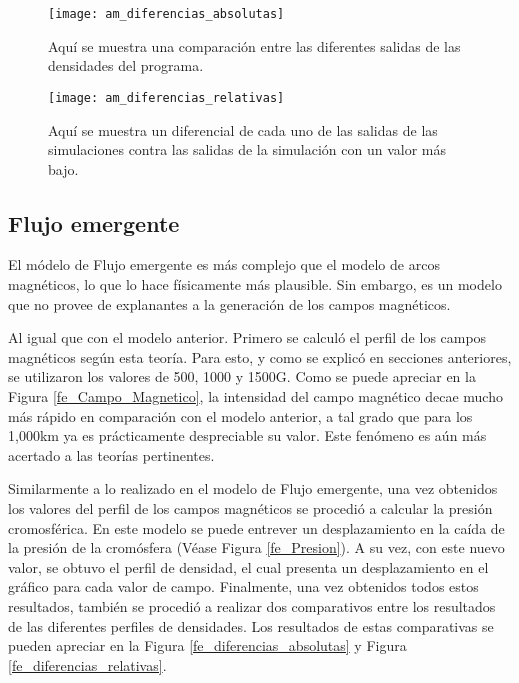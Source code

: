 \begin{figure}[h]
\centering
\texttt{[image: am\_diferencias\_absolutas]}
\caption{ Aqu\'i se muestra una comparaci\'on entre las diferentes salidas de las densidades del programa.}
\label{am_diferencias_absolutas}
\end{figure}

\begin{figure}[h]
\centering
\texttt{[image: am\_diferencias\_relativas]}
\caption{ Aqu\'i se muestra un diferencial de cada uno de las salidas de las simulaciones contra las salidas de la simulaci\'on con un valor m\'as bajo.}
\label{am_diferencias_relativas}
\end{figure}


\clearpage
\subsection{Flujo emergente}
El m\'odelo de Flujo emergente es m\'as complejo que el modelo de arcos magn\'eticos, lo que lo hace f\'isicamente m\'as plausible. Sin embargo, es un modelo que no provee de explanantes a la generaci\'on de los campos magn\'eticos.

Al igual que con el modelo anterior. Primero se calcul\'o el perfil de los campos magn\'eticos seg\'un esta teor\'ia. Para esto, y como se explic\'o en secciones anteriores, se utilizaron los valores de 500, 1000 y 1500G. Como se puede apreciar en la Figura \ref{fe_Campo_Magnetico}, la intensidad del campo magn\'etico decae mucho m\'as r\'apido en comparaci\'on con el modelo anterior, a tal grado que para los 1,000km ya es pr\'acticamente despreciable su valor. Este fen\'omeno es a\'un m\'as acertado a las teor\'ias pertinentes.

Similarmente a lo realizado en el modelo de Flujo emergente, una vez obtenidos los valores del perfil de los campos magn\'eticos se procedi\'o a calcular la presi\'on cromosf\'erica. En este modelo se puede entrever un desplazamiento en la ca\'ida de la presi\'on de la crom\'osfera (V\'ease Figura \ref{fe_Presion}). A su vez, con este nuevo valor, se obtuvo el perfil de densidad, el cual presenta un desplazamiento en el gr\'afico para cada valor de campo. 
Finalmente, una vez obtenidos todos estos resultados, tambi\'en se procedi\'o a realizar dos comparativos entre los resultados de las diferentes perfiles de densidades. Los resultados de estas comparativas se pueden apreciar en la Figura \ref{fe_diferencias_absolutas} y Figura \ref{fe_diferencias_relativas}.

